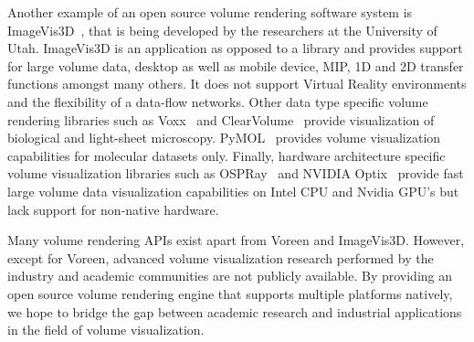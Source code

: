 Another example of an open source volume rendering software system is
ImageVis3D~\citep{cibc_imagevis3D:_2016}, that is being developed by the
researchers at the University of Utah. ImageVis3D is an application as opposed
to a library and provides support for large volume data, desktop as well as
mobile device, MIP, 1D and 2D transfer functions amongst many others.  It does
not support Virtual Reality environments and the flexibility of a data-flow
networks. Other data type specific volume rendering libraries such as
Voxx~\citep{clendenon_voxx:_2002} and ClearVolume~\citep{royer_clearvolume:_2015}
provide visualization of biological and light-sheet microscopy.
PyMOL~\citep{schrodinger_llc_pymol_2015} provides volume visualization
capabilities for molecular datasets only. Finally, hardware architecture specific
volume visualization libraries such as OSPRay~\citep{wald_ospray_2017} and
NVIDIA\textsuperscript{\textregistered}
Optix\textsuperscript{\texttrademark}~\citep{parker_optix:_2010} provide fast
large volume data visualization capabilities on Intel CPU and Nvidia GPU's but
lack support for non-native hardware.

Many volume rendering APIs exist apart from Voreen and ImageVis3D. However,
except for Voreen, advanced volume visualization research performed by the
industry and academic communities are not publicly available. By providing an
open source volume rendering engine that supports multiple platforms natively,
we hope to bridge the gap between academic research and industrial applications
in the field of volume visualization.
